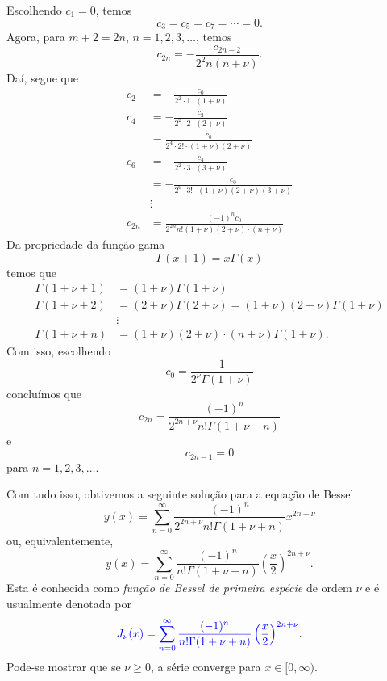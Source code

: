 Escolhendo $c_1=0$, temos
\begin{equation}
  c_3=c_5=c_7=\cdots=0.
\end{equation}
Agora, para $m+2=2n$, $n=1,2,3,\ldots$, temos
\begin{equation}
  c_{2n} = -\frac{c_{2n-2}}{2^2n(n+\nu)}.
\end{equation}
Daí, segue que
\begin{align}
  c_2 &= -\frac{c_0}{2^2\cdot 1\cdot (1+\nu)}\\
  c_4 &= -\frac{c_2}{2^2\cdot 2\cdot (2+\nu)}\\
      &= \frac{c_0}{2^4\cdot 2!\cdot (1+\nu)(2+\nu)}\\
  c_6 &= -\frac{c_4}{2^2\cdot 3\cdot (3+\nu)}\\
      &= -\frac{c_0}{2^6\cdot 3!\cdot (1+\nu)(2+\nu)(3+\nu)}\\
      &\vdots\\
  c_{2n} &= \frac{(-1)^nc_0}{2^{2n}n!(1+\nu)(2+\nu)\cdot(n+\nu)}
\end{align}
Da propriedade da função gama
\begin{equation}
  \Gamma(x+1) = x\Gamma(x)
\end{equation}
temos que
\begin{align}
  \Gamma(1+\nu+1) &= (1+\nu)\Gamma(1+\nu)\\
  \Gamma(1+\nu+2) &= (2+\nu)\Gamma(2+\nu)=(1+\nu)(2+\nu)\Gamma(1+\nu)\\
                &\vdots\\
  \Gamma(1+\nu+n) &= (1+\nu)(2+\nu)\cdot(n+\nu)\Gamma(1+\nu). 
\end{align}
Com isso, escolhendo
\begin{equation}
  c_0 = \frac{1}{2^\nu\Gamma(1+\nu)}
\end{equation}
concluímos que
\begin{equation}
  c_{2n} = \frac{(-1)^n}{2^{2n+\nu}n!\Gamma(1+\nu+n)}
\end{equation}
e
\begin{equation}
  c_{2n-1}=0
\end{equation}
para $n=1,2,3,\ldots$.

Com tudo isso, obtivemos a seguinte solução para a equação de Bessel
\begin{equation}
  y(x) = \sum_{n=0}^\infty \frac{(-1)^n}{2^{2n+\nu}n!\Gamma(1+\nu+n)}x^{2n+\nu}
\end{equation}
ou, equivalentemente,
\begin{equation}
  y(x) = \sum_{n=0}^\infty \frac{(-1)^n}{n!\Gamma(1+\nu+n)}\left(\frac{x}{2}\right)^{2n+\nu}.
\end{equation}
Esta é conhecida como \emph{função de Bessel de primeira espécie} de ordem $\nu$ e é usualmente denotada por
\begin{equation}
  {\color{blue}J_\nu(x) = \sum_{n=0}^\infty \frac{(-1)^n}{n!\Gamma(1+\nu+n)}\left(\frac{x}{2}\right)^{2n+\nu}}. 
\end{equation}
Pode-se mostrar que se $\nu\geq 0$, a série converge para $x\in [0, \infty)$.

